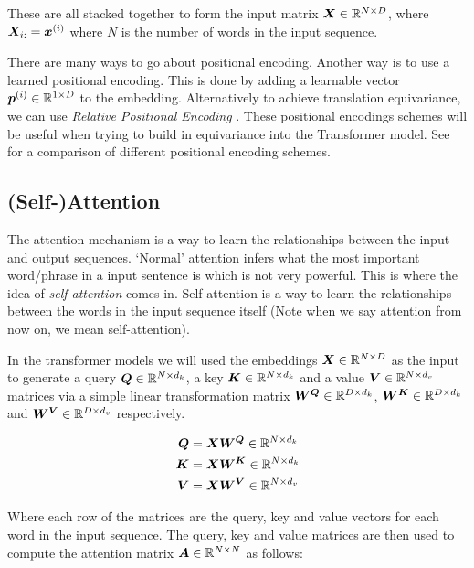 \documentclass[../main.tex]{subfiles}
\begin{document}
\noi These are all stacked together to form the input matrix $\bm{X} \in \mathbb{R}^{N \times D}$, where $\bm{X}_{i:} = \bm{x}^{(i)}$ where $N$ is the number of words in the input sequence.

\begin{note}
	There are many ways to go about positional encoding. Another way is to use a learned positional encoding. This is done by adding a learnable vector $\bm{p}^{(i)} \in \mathbb{R}^{1 \times D}$ to the embedding. Alternatively to achieve translation equivariance, we can use \emph{Relative Positional Encoding} \cite{shaw2018selfattention, wu2021rethinking}. These positional encodings schemes will be useful when trying to build in equivariance into the Transformer model. See 
	\cite{kazemnejad2019:pencoding} for a comparison of different positional encoding schemes.
\end{note}


\subsection{(Self-)Attention}

The attention mechanism is a way to learn the relationships between the input and output sequences. `Normal' attention infers what the most important word/phrase in a input sentence is which is not very powerful. This is where the idea of \emph{self-attention} comes in. Self-attention is a way to learn the relationships between the words in the input sequence itself (Note when we say attention from now on, we mean self-attention). 

In the transformer models we will used the embeddings $\bm{X} \in \mathbb{R}^{N \times D}$ as the input to generate a query $\bm{Q} \in \mathbb{R}^{N \times d_k}$, a key $\bm{K} \in \mathbb{R}^{N \times d_k}$ and a value $\bm{V} \in \mathbb{R}^{N \times d_v}$ matrices via a simple linear transformation matrix $\bm{W^Q} \in \mathbb{R}^{D \times d_k}$, $\bm{W^K} \in \mathbb{R}^{D \times d_k}$ and $\bm{W^V} \in \mathbb{R}^{D \times d_v}$ respectively. 

\begin{align*}
	\bm{Q} &= \bm{X}\bm{W^Q} \in \mathbb{R}^{N \times d_k}\\
	\bm{K} &= \bm{X}\bm{W^K} \in \mathbb{R}^{N \times d_k}\\
	\bm{V} &= \bm{X}\bm{W^V} \in \mathbb{R}^{N \times d_v}
\end{align*}


Where each row of the matrices are the query, key and value vectors for each word in the input sequence. The query, key and value matrices are then used to compute the attention matrix $\bm{A} \in \mathbb{R}^{N \times N}$ as follows:
\end{document}
